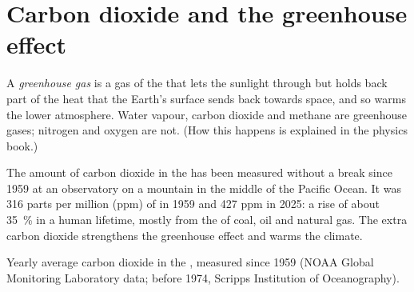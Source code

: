 \section{Carbon dioxide and the greenhouse effect}

\begin{definition}\label{def:g8:combustion-and-fuels:greenhouse}
A \emph{greenhouse gas} is a gas of the  that
lets the sunlight through but holds back part of the heat that the
Earth's surface sends back towards space, and so warms the lower
atmosphere. Water vapour, carbon dioxide and methane are greenhouse
gases; nitrogen and oxygen are not. (How this happens is explained in the
physics book.)
\end{definition}

\begin{proposition}\label{prop:g8:combustion-and-fuels:rising}
The amount of carbon dioxide in the  has been measured without a
break since 1959 at an observatory on a mountain in the middle of the
Pacific Ocean. It was 316 parts per million (ppm) of  in 1959 and 427
ppm in 2025: a rise of about \qty{35}{\percent} in a human lifetime,
mostly from the  of coal, oil and natural gas. The extra carbon
dioxide strengthens the greenhouse effect and warms the climate.
\end{proposition}

\begin{omfigure}

{\small Yearly average carbon dioxide in the , measured since 1959
(NOAA Global Monitoring Laboratory data; before 1974, Scripps
Institution of Oceanography).}
\end{omfigure}

